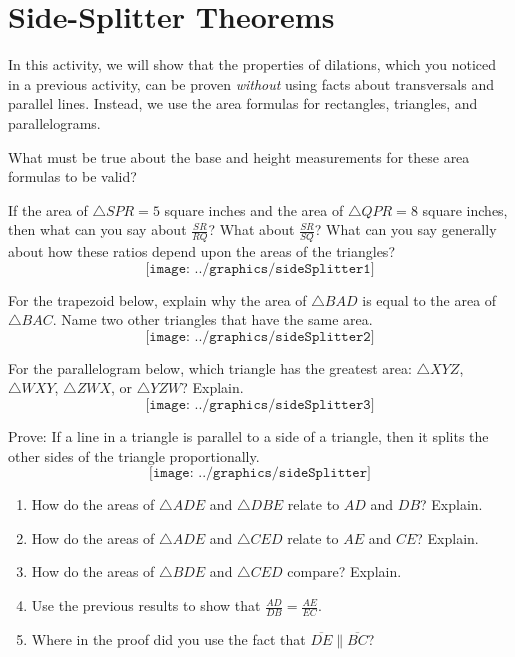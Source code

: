 \newpage

\section{Side-Splitter Theorems}
In this activity, we will show that the properties of dilations, which you noticed in a previous activity, can be proven \emph{without} using facts about transversals and parallel lines.  Instead, we use the area formulas for rectangles, triangles, and parallelograms.  
\begin{question}
What must be true about the base and height measurements for these area formulas to be valid? 
\end{question}

\begin{prob}
If the area of $\triangle SPR = 5$ square inches and the area of $\triangle QPR = 8$ square inches, then what can you say about $\frac{SR}{RQ}$?  What about $\frac{SR}{SQ}$?  What can you say generally about how these ratios depend upon the areas of the triangles?  
$$\texttt{[image: ../graphics/sideSplitter1]}$$
\end{prob}

\begin{prob}
For the trapezoid below, explain why the area of $\triangle BAD$ is equal to the area of $\triangle BAC$.  Name two other triangles that have the same area.
$$\texttt{[image: ../graphics/sideSplitter2]}$$
\end{prob}

\begin{prob}
For the parallelogram below, which triangle has the greatest area: $\triangle XYZ$, $\triangle WXY$, $\triangle ZWX$, or $\triangle YZW$?  Explain.  
$$\texttt{[image: ../graphics/sideSplitter3]}$$
\end{prob}

\begin{prob}
Prove:  If a line in a triangle is parallel to a side of a triangle, then it splits the other sides of the triangle proportionally.
$$\texttt{[image: ../graphics/sideSplitter]}$$
\begin{enumerate}
\item How do the areas of $\triangle ADE$ and $\triangle DBE$ relate to $AD$ and $DB$?  Explain.  
\item How do the areas of $\triangle ADE$ and $\triangle CED$ relate to $AE$ and $CE$?  Explain. 
\item How do the areas of $\triangle BDE$ and $\triangle CED$ compare?  Explain.  
\item Use the previous results to show that $\frac{AD}{DB} = \frac{AE}{EC}$.  
\item Where in the proof did you use the fact that $\overline{DE} \parallel \overline{BC}$?  
\end{enumerate}
\end{prob}

